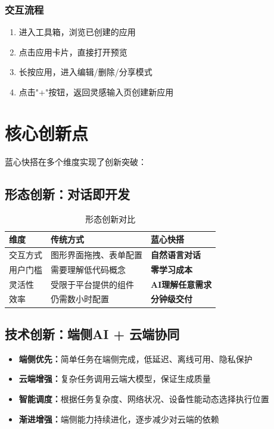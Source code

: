 \documentclass[a4paper,12pt]{ctexart}
\newcommand{\highlight}[1]{\textcolor{vivoblue}{\textbf{#1}}}
\begin{document}
\subsubsection{交互流程}
\begin{enumerate}[leftmargin=2em]
    \item 进入工具箱，浏览已创建的应用
    \item 点击应用卡片，直接打开预览
    \item 长按应用，进入编辑/删除/分享模式
    \item 点击"+"按钮，返回灵感输入页创建新应用
\end{enumerate}

\section{核心创新点}

蓝心快搭在多个维度实现了创新突破：

\subsection{形态创新：对话即开发}

\begin{table}[H]
    \centering
    \caption{形态创新对比}
    \begin{tabularx}{\textwidth}{|l|X|X|}
        \hline
        \textbf{维度} & \textbf{传统方式} & \textbf{蓝心快搭} \\
        \hline
        交互方式 & 图形界面拖拽、表单配置 & \highlight{自然语言对话} \\
        \hline
        用户门槛 & 需要理解低代码概念 & \highlight{零学习成本} \\
        \hline
        灵活性 & 受限于平台提供的组件 & \highlight{AI理解任意需求} \\
        \hline
        效率 & 仍需数小时配置 & \highlight{分钟级交付} \\
        \hline
    \end{tabularx}
\end{table}

\subsection{技术创新：端侧AI + 云端协同}

\begin{itemize}[leftmargin=2em]
    \item \highlight{端侧优先：}简单任务在端侧完成，低延迟、离线可用、隐私保护
    \item \highlight{云端增强：}复杂任务调用云端大模型，保证生成质量
    \item \highlight{智能调度：}根据任务复杂度、网络状况、设备性能动态选择执行位置
    \item \highlight{渐进增强：}端侧能力持续进化，逐步减少对云端的依赖
\end{itemize}
\end{document}
